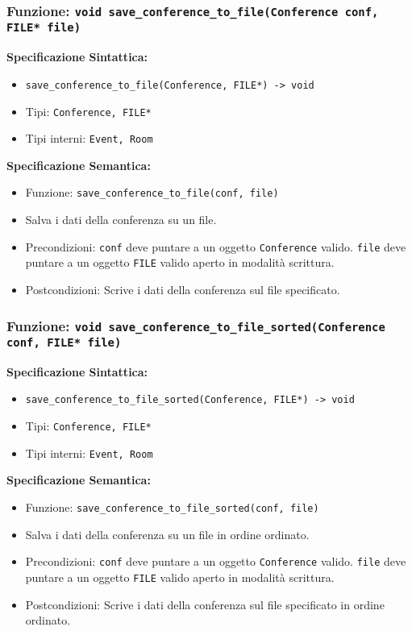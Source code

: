 \documentclass[11pt]{scrartcl} %
\begin{document}
\subsubsection{Funzione: \texttt{void save\_conference\_to\_file(Conference conf, FILE* file)}}

\textbf{Specificazione Sintattica:}
\begin{itemize}
\item \texttt{save\_conference\_to\_file(Conference, FILE*) -> void}
\item Tipi: \texttt{Conference, FILE*}
\item Tipi interni: \texttt{Event, Room}
\end{itemize}

\textbf{Specificazione Semantica:}
\begin{itemize}
\item Funzione: \texttt{save\_conference\_to\_file(conf, file)}
\item Salva i dati della conferenza su un file.
\item Precondizioni: \texttt{conf} deve puntare a un oggetto \texttt{Conference} valido. \texttt{file} deve puntare a un oggetto \texttt{FILE} valido aperto in modalità scrittura.
\item Postcondizioni: Scrive i dati della conferenza sul file specificato.
\end{itemize}

\subsubsection{Funzione: \texttt{void save\_conference\_to\_file\_sorted(Conference conf, FILE* file)}}

\textbf{Specificazione Sintattica:}
\begin{itemize}
\item \texttt{save\_conference\_to\_file\_sorted(Conference, FILE*) -> void}
\item Tipi: \texttt{Conference, FILE*}
\item Tipi interni: \texttt{Event, Room}
\end{itemize}

\textbf{Specificazione Semantica:}
\begin{itemize}
\item Funzione: \texttt{save\_conference\_to\_file\_sorted(conf, file)}
\item Salva i dati della conferenza su un file in ordine ordinato.
\item Precondizioni: \texttt{conf} deve puntare a un oggetto \texttt{Conference} valido. \texttt{file} deve puntare a un oggetto \texttt{FILE} valido aperto in modalità scrittura.
\item Postcondizioni: Scrive i dati della conferenza sul file specificato in ordine ordinato.
\end{itemize}
\end{document}
